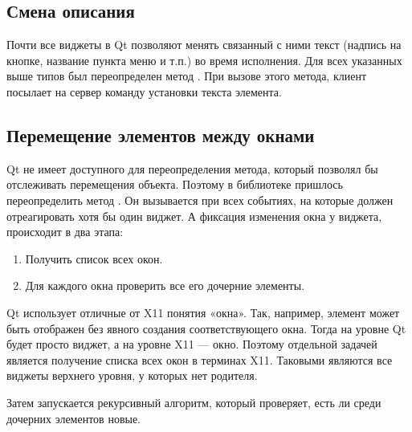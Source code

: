 \subsection{Смена описания}

Почти все виджеты в Qt позволяют менять связанный с ними текст (надпись на
кнопке, название пункта меню и т.п.) во время исполнения. Для всех указанных
выше типов был переопределен метод . При вызове этого метода,
клиент посылает на сервер команду установки текста элемента.

\subsection{Перемещение элементов между окнами}

Qt не имеет доступного для переопределения метода, который позволял бы
отслеживать перемещения объекта. Поэтому в библиотеке пришлось переопределить
метод . Он вызывается при всех событиях, на которые должен
отреагировать хотя бы один виджет. А фиксация изменения окна у виджета, происходит
в два этапа:

\begin{enumerate}
  \item Получить список всех окон.
  \item Для каждого окна проверить все его дочерние элементы.
\end{enumerate}

Qt использует отличные от X11 понятия «окна». Так, например, элемент может быть
отображен без явного создания соответствующего окна. Тогда на уровне Qt будет
просто виджет, а на уровне X11 --- окно. Поэтому отдельной задачей является
получение списка всех окон в терминах X11. Таковыми являются все виджеты
верхнего уровня, у которых нет родителя.

%
%

Затем запускается рекурсивный алгоритм, который проверяет, есть ли среди
дочерних элементов новые.

\begin{algorithm}[H]
\end{algorithm}

